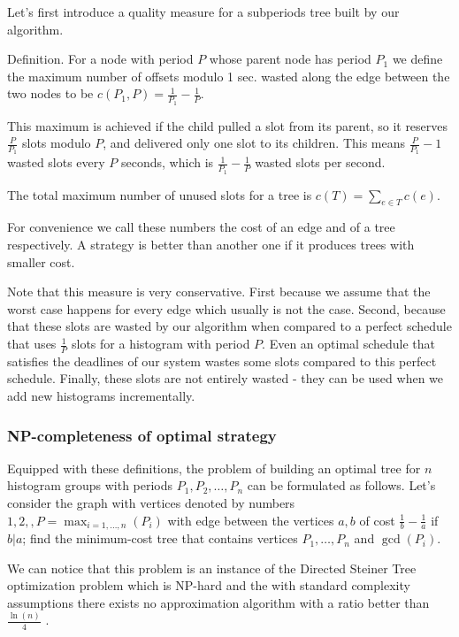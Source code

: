 Let’s first introduce a quality measure for a subperiods tree built by our algorithm. 

\begin{definition}
Definition. For a node with period $P$ whose parent node has period $P_1$ we define the maximum number of offsets modulo 1 sec. wasted along the edge between the two nodes to be $c(P_1,P)=\frac{1}{P_1}-\frac 1 P$.
\end{definition}

This maximum is achieved if the child pulled a slot from its parent, so it reserves $\frac P {P_1}$ slots modulo $P$, and delivered only one slot to its children. This means $\frac P {P_1}-1$ wasted slots every $P$ seconds, which is $\frac 1 {P_1}- \frac 1 P$ wasted slots per second. 

\begin{definition}
The total maximum number of unused slots for a tree is $c(T)=\sum_{e\in T}c(e)$. 
\end{definition}

For convenience we call these numbers the cost of an edge and of a tree respectively. A strategy is better than another one if it produces trees with smaller cost. 

Note that this measure is very conservative. First because we assume that the worst case happens for every edge which usually is not the case. Second, because that these slots are wasted by our algorithm when compared to a perfect schedule that uses $\frac 1 P $ slots for a histogram with period $P$. Even an optimal schedule that satisfies the deadlines of our system wastes some slots compared to this perfect schedule. Finally, these slots are not entirely wasted - they can be used when we add new histograms incrementally.

\subsubsection*{NP-completeness of optimal strategy}

Equipped with these definitions, the problem of building an optimal tree for $n$ histogram groups with periods $P_1, P_2, \ldots,P_n$ can be formulated as follows. Let’s consider the graph with vertices denoted by numbers $1,2,,P=\max_{i=1,\ldots,n}(P_i)$ with edge between the vertices $a, b$ of cost $\frac 1 b -\frac 1 a$ if $b \vert a$; find the minimum-cost tree that contains vertices $P_1,\ldots,P_n$ and $\gcd(P_i)$.

We can notice that this problem is an instance of the Directed Steiner Tree optimization problem which is NP-hard and the with standard complexity assumptions there exists no approximation algorithm with a ratio better than $\frac {\ln (n)} 4$ \citep{zelikovsky1997series, ming2006fasterdsp}.

